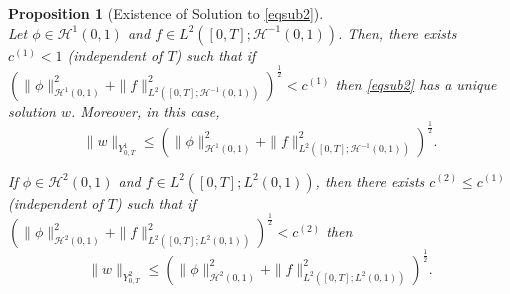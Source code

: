 \documentclass[10pt,a4paper,final]{article}
\numberwithin{equation}{section}
\newtheorem{prop}[theorem]{Proposition}
\newcommand{\cH}{\mathcal{H}}
\begin{document}
\begin{prop}[Existence of Solution to \eqref{eqsub2}]\label{existsub2}\ \\
    Let $\phi \in \cH^1(0,1)$ and $f\in L^2([0,T];\cH^{-1}(0,1))$. Then, there exists $c^{(1)}<1$ (independent of $T$) such that if $(\|\phi\|_{\cH^1(0,1)}^2+\|f\|^2_{L^2([0,T];\cH^{-1}(0,1))})^{\frac12}<c^{(1)}$ then \eqref{eqsub2} has a unique solution $w$. Moreover, in this case,  $$\|w\|_{Y^{1}_{0,T}}\leq (\|\phi\|^2_{\cH^1(0,1)}+\|f\|^2_{L^2([0,T];\cH^{-1}(0,1))})^{\frac12}.$$

    If $\phi \in \cH^2(0,1)$ and $f\in L^2([0,T];L^2(0,1))$, then there exists $c^{(2)}\leq c^{(1)}$ (independent of $T$) such that if  $(\|\phi\|_{\cH^2(0,1)}^2+\|f\|^2_{L^2([0,T];L^2(0,1))})^{\frac12}<c^{(2)}$ then $$\|w\|_{Y^{2}_{0,T}}\leq (\|\phi\|^2_{\cH^2(0,1)}+\|f\|^2_{L^2([0,T];L^2(0,1))})^{\frac12}.$$
\end{prop}
\end{document}
